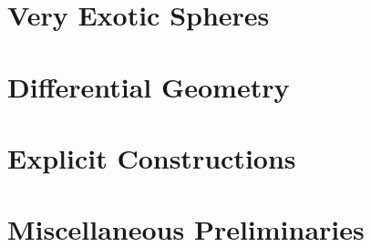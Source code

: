 \documentclass{lkx_thesis}
\begin{document}
\chapter{Very Exotic Spheres}\label{chap:homotopy}


\begin{appendices}
	\chapter{Differential Geometry}\label{chap:differential_geometry}
	

	\chapter{Explicit Constructions}\label{chap:explicit-constructions}
	
	\chapter{Miscellaneous Preliminaries}\label{chap:misc-appendix}
	
\end{appendices}

\lkxrefs
\lkxindex
\end{document}
